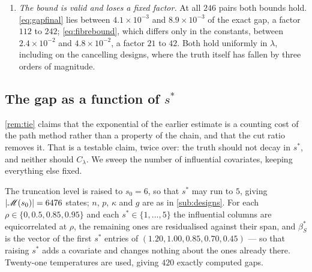 \documentclass[aos]{imsart}
\DeclarePairedDelimiter{\abs}{\lvert}{\rvert}
\theoremstyle{plain}
\theoremstyle{definition}
\begin{document}
\begin{enumerate}[label=(\roman*),leftmargin=2.6em]
        every one of the $246$ pairs --- \eqref{eq:crossprop} is an
        inequality only because a single marginal is bounded by a coarser
        one --- and $C_\lambda$ is the ascent's congestion exactly. On these
        six designs the coordinates of $\gamma^{\ast}$ interact strongly, so
        the crossover is useless, its congestion reaching
        $1.6\times10^{1}$, $5.6\times10^{11}$, $2.0\times10^{26}$,
        $1.0\times10^{33}$ on the four equicorrelated designs, and the
        minimum in~\eqref{eq:gapfinal} is $C_\lambda$ at every pair. The roles
        reverse on the profile of \cref{rem:extremal}, where
        $C_\lambda=2^{s^{\ast}}/4$ and $M_\lambda=1$. The intermediate
        quantity $e^{2r_\lambda}$ of~\eqref{eq:crossprop}, which exists only
        to reach \cref{prop:pdefect}, is by contrast very loose here: with
        $r_\lambda$ up to $54.4$ nats it exceeds $M_\lambda$ by factors
        $7.6\times10^{3}$ to $5.9\times10^{18}$, and it should be read only
        as a near-product statement.
        \item \emph{The bound is valid and loses a fixed factor.} At all
        $246$ pairs both bounds hold. \eqref{eq:gapfinal} lies between
        $4.1\times10^{-3}$ and $8.9\times10^{-3}$ of the exact gap, a factor
        $112$ to $242$; \eqref{eq:fibrebound}, which differs only in the
        constants, between $2.4\times10^{-2}$ and $4.8\times10^{-2}$, a
        factor $21$ to $42$. Both hold uniformly in $\lambda$, including on
        the cancelling designs, where the truth itself has fallen by three
        orders of magnitude.
    \end{enumerate}

    \subsection{The gap as a function of $s^{\ast}$}
    \label{sub:sstar}

    \cref{rem:tie} claims that the exponential of the earlier estimate is a
    counting cost of the path method rather than a property of the chain,
    and that the cut ratio removes it. That is a testable claim, twice over:
    the truth should not decay in $s^{\ast}$, and neither should
    $C_\lambda$. We sweep the number of influential covariates, keeping
    everything else fixed.

    The truncation level is raised to $s_0=6$, so that $s^{\ast}$ may run to
    $5$, giving $\abs{\mathscr{M}(s_0)}=6476$ states; $n$, $p$, $\kappa$ and
    $g$ are as in \cref{sub:designs}. For each
    $\rho\in\{0,0.5,0.85,0.95\}$ and each $s^{\ast}\in\{1,\dots,5\}$ the
    influential columns are equicorrelated at $\rho$, the remaining ones are
    residualised against their span, and
    $\beta^{\ast}_S$ is the vector of the first $s^{\ast}$ entries of
    $(1.20,1.00,0.85,0.70,0.45)$ --- so that raising $s^{\ast}$ adds a
    covariate and changes nothing about the ones already there. Twenty-one
    temperatures are used, giving $420$ exactly computed gaps.
\end{document}
